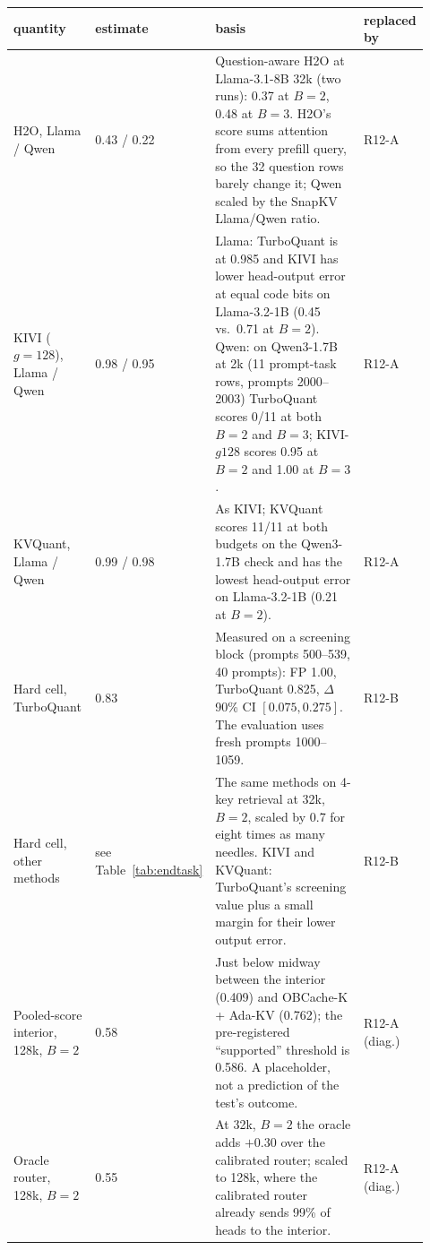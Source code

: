 \begin{table}[h]
\centering
\scriptsize
\setlength{\tabcolsep}{3pt}
\begin{tabular}{@{}p{0.2\linewidth}p{0.13\linewidth}p{0.49\linewidth}p{0.1\linewidth}@{}}
\toprule
quantity & estimate & basis & replaced by \\
\midrule
H2O, Llama / Qwen & 0.43 / 0.22 & Question-aware H2O at Llama-3.1-8B 32k (two runs): 0.37 at $B=2$, 0.48 at $B=3$.  H2O's score sums attention from every prefill query, so the 32 question rows barely change it; Qwen scaled by the SnapKV Llama/Qwen ratio. & R12-A \\
KIVI ($g{=}128$), Llama / Qwen & 0.98 / 0.95 & Llama: TurboQuant is at 0.985 and KIVI has lower head-output error at equal code bits on Llama-3.2-1B (0.45 vs.\ 0.71 at $B=2$).  Qwen: on Qwen3-1.7B at 2k (11 prompt-task rows, prompts 2000--2003) TurboQuant scores 0/11 at both $B=2$ and $B=3$; KIVI-$g128$ scores 0.95 at $B=2$ and 1.00 at $B=3$. & R12-A \\
KVQuant, Llama / Qwen & 0.99 / 0.98 & As KIVI; KVQuant scores 11/11 at both budgets on the Qwen3-1.7B check and has the lowest head-output error on Llama-3.2-1B (0.21 at $B=2$). & R12-A \\
Hard cell, TurboQuant & 0.83 & Measured on a screening block (prompts 500--539, 40 prompts): FP 1.00, TurboQuant 0.825, $\Delta$ 90\% CI $[0.075,0.275]$.  The evaluation uses fresh prompts 1000--1059. & R12-B \\
Hard cell, other methods & see Table~\ref{tab:endtask} & The same methods on 4-key retrieval at 32k, $B=2$, scaled by 0.7 for eight times as many needles.  KIVI and KVQuant: TurboQuant's screening value plus a small margin for their lower output error. & R12-B \\
Pooled-score interior, 128k, $B=2$ & 0.58 & Just below midway between the interior (0.409) and OBCache-K + Ada-KV (0.762); the pre-registered ``supported'' threshold is 0.586.  A placeholder, not a prediction of the test's outcome. & R12-A (diag.) \\
Oracle router, 128k, $B=2$ & 0.55 & At 32k, $B=2$ the oracle adds $+0.30$ over the calibrated router; scaled to 128k, where the calibrated router already sends 99\% of heads to the interior. & R12-A (diag.) \\
\bottomrule
\end{tabular}
\end{table}
